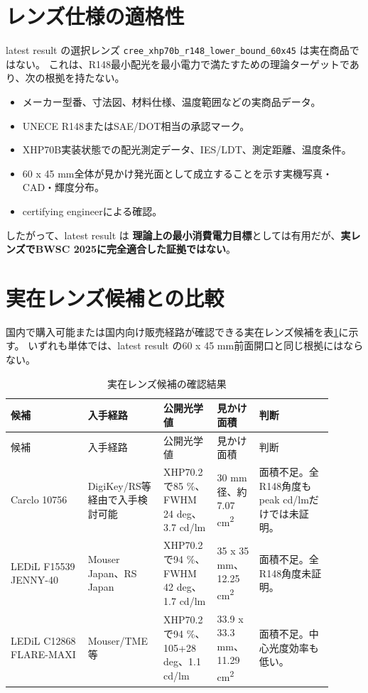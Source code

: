 \documentclass[11pt,a4paper]{article}
\newcommand{\code}[1]{\texttt{#1}}
\begin{document}
\section{レンズ仕様の適格性}
latest result の選択レンズ \code{cree\_xhp70b\_r148\_lower\_bound\_60x45} は実在商品ではない。
これは、R148最小配光を最小電力で満たすための理論ターゲットであり、次の根拠を持たない。

\begin{itemize}
\item メーカー型番、寸法図、材料仕様、温度範囲などの実商品データ。
\item UNECE R148またはSAE/DOT相当の承認マーク。
\item XHP70B実装状態での配光測定データ、IES/LDT、測定距離、温度条件。
\item 60 x 45 mm全体が見かけ発光面として成立することを示す実機写真・CAD・輝度分布。
\item certifying engineerによる確認。
\end{itemize}

したがって、latest result は \textbf{理論上の最小消費電力目標}としては有用だが、\textbf{実レンズでBWSC 2025に完全適合した証拠ではない}。

\section{実在レンズ候補との比較}
国内で購入可能または国内向け販売経路が確認できる実在レンズ候補を表\ref{tab:real_lenses}に示す。
いずれも単体では、latest result の60 x 45 mm前面開口と同じ根拠にはならない。

\begin{longtable}{p{0.22\linewidth}p{0.20\linewidth}p{0.15\linewidth}p{0.12\linewidth}p{0.21\linewidth}}
\caption{実在レンズ候補の確認結果}
\label{tab:real_lenses}\\
\toprule
候補 & 入手経路 & 公開光学値 & 見かけ面積 & 判断\\
\midrule
\endfirsthead
\toprule
候補 & 入手経路 & 公開光学値 & 見かけ面積 & 判断\\
\midrule
\endhead
Carclo 10756 & DigiKey/RS等経由で入手検討可能 & XHP70.2で85 \%、FWHM 24 deg、3.7 cd/lm & 30 mm径、約7.07 cm\textsuperscript{2} & 面積不足。全R148角度もpeak cd/lmだけでは未証明。\\
LEDiL F15539 JENNY-40 & Mouser Japan、RS Japan & XHP70.2で94 \%、FWHM 42 deg、1.7 cd/lm & 35 x 35 mm、12.25 cm\textsuperscript{2} & 面積不足。全R148角度未証明。\\
LEDiL C12868 FLARE-MAXI & Mouser/TME等 & XHP70.2で94 \%、105+28 deg、1.1 cd/lm & 33.9 x 33.3 mm、11.29 cm\textsuperscript{2} & 面積不足。中心光度効率も低い。\\
\bottomrule
\end{longtable}
\end{document}
